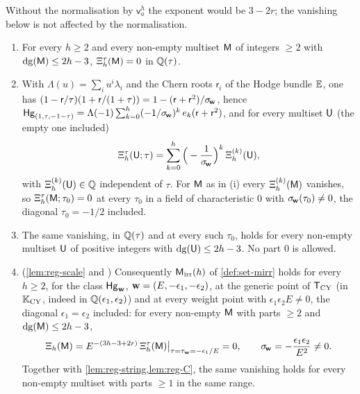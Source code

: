 Without the normalisation by $\mathsf{v}_a^h$ the exponent would be $3-2r$; the vanishing below is not affected by the normalisation.

\begin{thm}
\label{thm:reg-L}
\begin{enumerate}
\item[(i)] \textup{\cite[Theorem~8.1]{LP2}} For every $h\geq 2$ and every non-empty multiset $\mathsf{M}$ of integers $\geq 2$ with $\mathrm{dg}(\mathsf{M})\leq 2h-3$, $\Xi^{\tau}_h(\mathsf{M})=0$ in $\mathbb{Q}(\tau)$.
\item[(ii)] \textup{\cite[Corollary~8.2]{LP2}} With $\Lambda(u)=\sum_iu^i\lambda_i$ and the Chern roots $\mathsf{r}_i$ of the Hodge bundle $\mathbb{E}$, one has $(1-\mathsf{r}/\tau)(1+\mathsf{r}/(1+\tau))=1-(\mathsf{r}+\mathsf{r}^2)/\sigma_{\!\mathbf{w}}$, hence $\mathsf{Hg}_{(1,\tau,-1-\tau)}=\Lambda(-1)\sum_{k=0}^h(-1/\sigma_{\!\mathbf{w}})^k\,e_k(\mathsf{r}+\mathsf{r}^2)$, and for every multiset $\mathsf{U}$ (the empty one included)
\begin{equation}
\label{eq:reg-laurent}
\Xi^{\tau}_h(\mathsf{U};\tau)=\sum_{k=0}^h\Big(-\frac{1}{\sigma_{\!\mathbf{w}}}\Big)^k\,\Xi^{(k)}_h(\mathsf{U}),
\end{equation}
with $\Xi^{(k)}_h(\mathsf{U})\in\mathbb{Q}$ independent of $\tau$. For $\mathsf{M}$ as in \textup{(i)} every $\Xi^{(k)}_h(\mathsf{M})$ vanishes, so $\Xi^{\tau}_h(\mathsf{M};\tau_0)=0$ at every $\tau_0$ in a field of characteristic $0$ with $\sigma_{\!\mathbf{w}}(\tau_0)\neq 0$, the diagonal $\tau_0=-1/2$ included.
\item[(iii)] \textup{\cite[Corollary~8.3]{LP2}} The same vanishing, in $\mathbb{Q}(\tau)$ and at every such $\tau_0$, holds for every non-empty multiset $\mathsf{U}$ of positive integers with $\mathrm{dg}(\mathsf{U})\leq 2h-3$. No part $0$ is allowed.
\item[(iv)] \textup{(\cref{lem:reg-scale} and \cite[Corollary~8.4]{LP2})} Consequently $\mathsf{M}_{\mathrm{irr}}(h)$ of \cref{def:set-mirr} holds for every $h\geq 2$, for the class $\mathsf{Hg}_{\mathbf{w}}$, $\mathbf{w}=(E,-\epsilon_1,-\epsilon_2)$, at the generic point of $\mathsf{T}_{\mathrm{CY}}$ (in $\mathbb{K}_{\mathrm{CY}}$, indeed in $\mathbb{Q}(\epsilon_1,\epsilon_2)$) and at every weight point with $\epsilon_1\epsilon_2E\neq 0$, the diagonal $\epsilon_1=\epsilon_2$ included: for every non-empty $\mathsf{M}$ with parts $\geq 2$ and $\mathrm{dg}(\mathsf{M})\leq 2h-3$,
\[
\Xi_h(\mathsf{M})=E^{-(3h-3+2r)}\,\Xi^{\tau}_h(\mathsf{M})\big|_{\tau=\tau_{\mathbf{w}}=-\epsilon_1/E}=0,\qquad \sigma_{\!\mathbf{w}}=-\frac{\epsilon_1\epsilon_2}{E^2}\neq 0 .
\]
Together with \cref{lem:reg-string,lem:reg-C}, the same vanishing holds for every non-empty multiset with parts $\geq 1$ in the same range.
\end{enumerate}
\end{thm}


